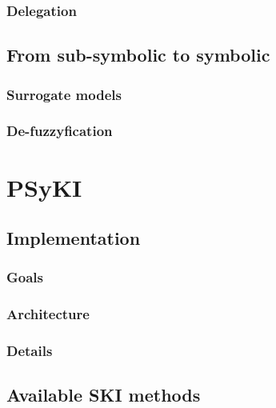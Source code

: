 \documentclass[12pt,a4paper,openright,twoside]{book}
\begin{document}
\subsection{Delegation}\label{subsec:delegation}

\section{From sub-symbolic to symbolic}\label{sec:from-sub-symbolic-to-symbolic}

\subsection{Surrogate models}\label{subsec:surrogate-models}

\subsection{De-fuzzyfication}\label{subsec:unfuzzyfication}


\chapter{\Acl{PSyKI}}\label{ch:psyki}

\section{Implementation}\label{sec:implementation}

\subsection{Goals}\label{subsec:goals}

\subsection{Architecture}\label{subsec:architecture}

\subsection{Details}\label{subsec:details}

\section{Available \ac{SKI} methods}\label{sec:available-ski-methods}
\end{document}
